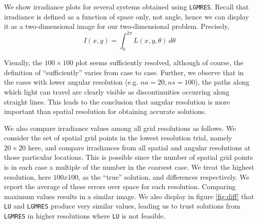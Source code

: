 \documentclass[10pt]{article}
\begin{document}
\begin{multicols}{2}

We show irradiance plots for several systems obtained using \texttt{LGMRES}.
Recall that irradiance is defined as a function of space only, not angle, hence we can display it as a two-dimensional image for our two-dimensional problem.
Precisely,
\begin{equation}
	I(x,y) = \int_0^{2\pi} L(x,y,\theta)\, d\theta
\end{equation}

Visually, the $100 \times 100$ plot seems sufficiently resolved, although of course, the definition of ``sufficiently'' varies from case to case.
Further, we observe that in the cases with lower angular resolution (e.g. $na=20,ns=100$), the paths along which light can travel are clearly visible as discontinuities occurring along straight lines.
This leads to the conclusion that angular resolution is more important than spatial resolution for obtaining accurate solutions.

We also compare irradiance values among all grid resolutions as follows.
We consider the set of spatial grid points in the lowest resolution trial, namely $20 \times 20$ here, and compare irradiances from all spatial and angular resolutions at those particular locations.
This is possible since the number of spatial grid points is in each case a multiple of the number in the coarsest case.
We treat the highest resolution, here $100 x 100$, as the ``true'' solution, and differences respectively.
We report the average of these errors over space for each resolution.
Comparing maximum values results in a similar image.
We also display in figure \ref{fig:diff} that \texttt{LU} and \texttt{LGMRES} produce very similar values, leading us to trust solutions from \texttt{LGMRES} in higher resolutions where \texttt{LU} is not feasible.


\end{multicols}
\end{document}
